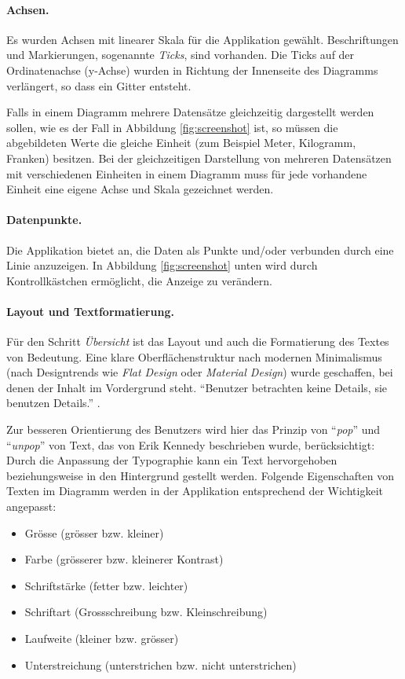 \paragraph{Achsen.} Es wurden Achsen mit linearer Skala für die Applikation gewählt. Beschriftungen und Markierungen, sogenannte \textit{Ticks}, sind vorhanden. Die Ticks auf der Ordinatenachse (y-Achse) wurden in Richtung der Innenseite des Diagramms verlängert, so dass ein Gitter entsteht.

Falls in einem Diagramm mehrere Datensätze gleichzeitig dargestellt werden sollen, wie es der Fall in Abbildung \ref{fig:screenshot} ist, so müssen die abgebildeten Werte die gleiche Einheit (zum Beispiel Meter, Kilogramm, Franken) besitzen. Bei der gleichzeitigen Darstellung von mehreren Datensätzen mit verschiedenen Einheiten in einem Diagramm muss für jede vorhandene Einheit eine eigene Achse und Skala gezeichnet werden.

\paragraph{Datenpunkte.} Die Applikation bietet an, die Daten als Punkte und/oder verbunden durch eine Linie anzuzeigen. In Abbildung \ref{fig:screenshot} unten wird durch Kontrollkästchen ermöglicht, die Anzeige zu verändern.

\paragraph{Layout und Textformatierung.} Für den Schritt \textit{Übersicht} ist das Layout und auch die Formatierung des Textes von Bedeutung. Eine klare Oberflächenstruktur nach modernen Minimalismus (nach Designtrends wie \textit{Flat Design} oder \textit{Material Design}) wurde geschaffen, bei denen der Inhalt im Vordergrund steht. "`Benutzer betrachten keine Details, sie benutzen Details."' \cite{minimalism}.

Zur besseren Orientierung des Benutzers wird hier das Prinzip von "`\textit{pop}"' und "`\textit{unpop}"' von Text, das von Erik Kennedy \cite{pop} beschrieben wurde, berücksichtigt: Durch die Anpassung der Typographie kann ein Text hervorgehoben beziehungsweise in den Hintergrund gestellt werden. Folgende Eigenschaften von Texten im Diagramm werden in der Applikation entsprechend der Wichtigkeit angepasst:

\begin{itemize}
	\item Grösse (grösser bzw. kleiner)
	\item Farbe (grösserer bzw. kleinerer Kontrast)
	\item Schriftstärke (fetter bzw. leichter)
	\item Schriftart (Grossschreibung bzw. Kleinschreibung)
	\item Laufweite (kleiner bzw. grösser)
	\item Unterstreichung (unterstrichen bzw. nicht unterstrichen)
\end{itemize}

